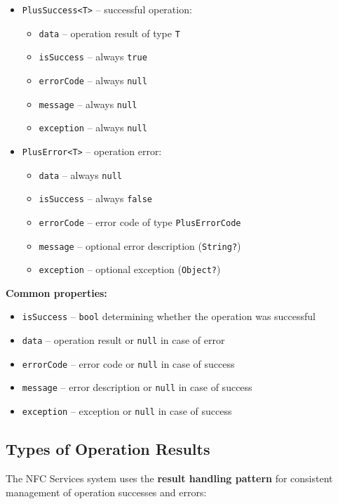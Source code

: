 \documentclass[a4paper,12pt]{article}
\begin{document}
\begin{itemize}
    \item \texttt{PlusSuccess<T>} -- successful operation:
    \begin{itemize}
        \item \texttt{data} -- operation result of type \texttt{T}
        \item \texttt{isSuccess} -- always \texttt{true}
        \item \texttt{errorCode} -- always \texttt{null}
        \item \texttt{message} -- always \texttt{null}
        \item \texttt{exception} -- always \texttt{null}
    \end{itemize}
    \item \texttt{PlusError<T>} -- operation error:
    \begin{itemize}
        \item \texttt{data} -- always \texttt{null}
        \item \texttt{isSuccess} -- always \texttt{false}
        \item \texttt{errorCode} -- error code of type \texttt{PlusErrorCode}
        \item \texttt{message} -- optional error description (\texttt{String?})
        \item \texttt{exception} -- optional exception (\texttt{Object?})
    \end{itemize}
\end{itemize}

\textbf{Common properties:}
\begin{itemize}
    \item \texttt{isSuccess} -- \texttt{bool} determining whether the operation was successful
    \item \texttt{data} -- operation result or \texttt{null} in case of error
    \item \texttt{errorCode} -- error code or \texttt{null} in case of success
    \item \texttt{message} -- error description or \texttt{null} in case of success
    \item \texttt{exception} -- exception or \texttt{null} in case of success
\end{itemize}

\newpage

\subsection{Types of Operation Results}
The NFC Services system uses the \textbf{result handling pattern} for consistent management of operation successes and errors:
\end{document}
